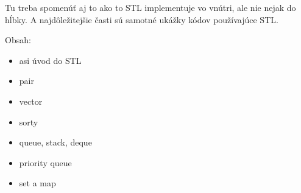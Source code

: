 




Tu treba spomenúť aj to ako to STL implementuje vo vnútri, ale nie nejak do hĺbky. A najdôležitejšie
časti sú samotné ukážky kódov používajúce STL.

Obsah:
\begin{itemize}
    \item asi úvod do STL
    \item pair
    \item vector
    \item sorty
    \item queue, stack, deque
    \item priority queue
    \item set a map
\end{itemize}


